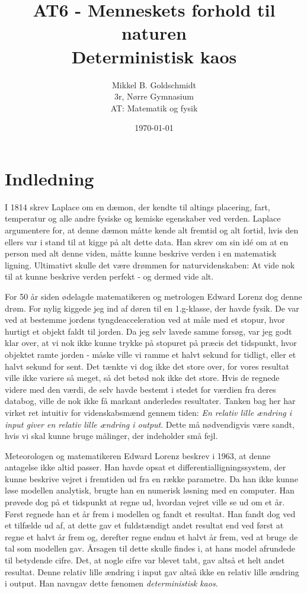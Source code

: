 \documentclass[12pt,a4paper]{article}
\author{Mikkel B. Goldschmidt\\ 3r, Nørre Gymnasium \\ AT: Matematik og fysik}
\title{AT6 - Menneskets forhold til naturen \\ Deterministisk kaos}
\date{\today}
\theoremstyle{break}
\theoremstyle{nonumberplain}
\begin{document}
\maketitle

\section{Indledning}
I 1814 skrev Laplace om en dæmon, der kendte til altings placering, fart, temperatur og alle andre fysiske og kemiske egenskaber ved verden.
Laplace argumentere for, at denne dæmon måtte kende alt fremtid og alt fortid, hvis den ellers var i stand til at kigge på alt dette data. 
Han skrev om sin idé om at en person med alt denne viden, måtte kunne beskrive verden i en matematisk ligning. 
Ultimativt skulle det være drømmen for naturvidenskaben: At vide nok til at kunne beskrive verden perfekt - og dermed vide alt.

For 50 år siden ødelagde matematikeren og metrologen Edward Lorenz dog denne drøm. 
 For nylig kiggede jeg ind af døren til en 1.g-klasse, der havde fysik. 
De var ved at bestemme jordens tyngdeacceleration ved at måle med et stopur, hvor hurtigt et objekt faldt til jorden. 
Da jeg selv lavede samme forsøg, var jeg godt klar over, at vi nok ikke kunne trykke på stopuret på præcis det tidspunkt, hvor objektet ramte jorden - måske ville vi ramme et halvt sekund for tidligt, eller et halvt sekund for sent. 
Det tænkte vi dog ikke det store over, for vores resultat ville ikke variere så meget, så det betød nok ikke det store. 
Hvis de regnede videre med den værdi, de selv havde bestemt i stedet for værdien fra deres databog, ville de nok ikke få markant anderledes resultater. 
Tanken bag her har virket ret intuitiv for videnskabsmænd gennem tiden: 
\textit{En relativ lille ændring i input giver en relativ lille ændring i output}. 
Dette må nødvendigvis være sandt, hvis vi skal kunne bruge målinger, der indeholder små fejl.

Meteorologen og matematikeren Edward Lorenz beskrev i 1963, at denne antagelse ikke altid passer. 
Han havde opsat et differentialligningssystem, der kunne beskrive vejret i fremtiden ud fra en række parametre. 
Da han ikke kunne løse modellen analytisk, brugte han en numerisk løsning med en computer. 
Han prøvede dog på et tidspunkt at regne ud, hvordan vejret ville se ud om et år. 
Først regnede han et år frem i modellen og fandt et resultat. 
Han fandt dog ved et tilfælde ud af, at dette gav et fuldstændigt andet resultat end ved først at regne et halvt år frem og, derefter  regne endnu et halvt år frem, ved at bruge de tal som modellen gav. 
Årsagen til dette skulle findes i, at hans model afrundede til betydende cifre. 
Det, at nogle cifre var blevet tabt, gav altså et helt andet resultat. 
Denne relativ lille ændring i input gav altså ikke en relativ lille ændring i output. 
Han navngav dette fænomen \textit{deterministisk kaos}.
\end{document}
